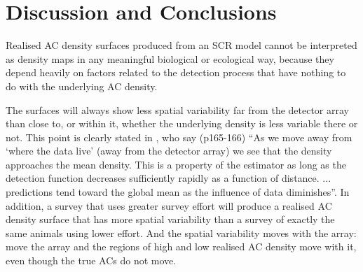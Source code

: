 \documentclass[useAMS,usenatbib,referee]{biom}
\begin{document}
\section{Discussion and Conclusions} \label{discussion}
 

Realised AC density surfaces produced from an SCR model cannot be interpreted as density maps in any meaningful biological or ecological way, because they depend heavily on factors related to the detection process that have nothing to do with the underlying AC density. 

The surfaces will always show less spatial variability far from the detector array than close to, or within it, whether the underlying density is less variable there or not. This point is clearly stated in \cite{Royle+al:13a}, who say (p165-166) ``As we move away from `where the data live' (away from the detector array) we see that the density approaches the mean density. This is a property of the estimator as long as the detection function decreases sufficiently rapidly as a function of distance. ... predictions tend toward the global mean as the influence of data diminishes''. In addition, a survey that uses greater survey effort will produce a realised AC density surface that has more spatial variability than a survey of exactly the same animals using lower effort. And the spatial variability moves with the array: move the array and the regions of high and low realised AC density move with it, even though the true ACs do not move.
\end{document}
